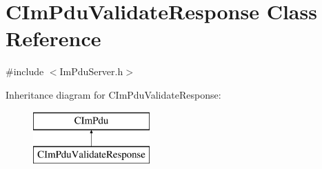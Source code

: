 \hypertarget{class_c_im_pdu_validate_response}{}\section{C\+Im\+Pdu\+Validate\+Response Class Reference}
\label{class_c_im_pdu_validate_response}


{\ttfamily \#include $<$Im\+Pdu\+Server.\+h$>$}

Inheritance diagram for C\+Im\+Pdu\+Validate\+Response\+:\begin{figure}[H]
\begin{center}
\leavevmode
\includegraphics[height=2.000000cm]{class_c_im_pdu_validate_response}
\end{center}
\end{figure}
